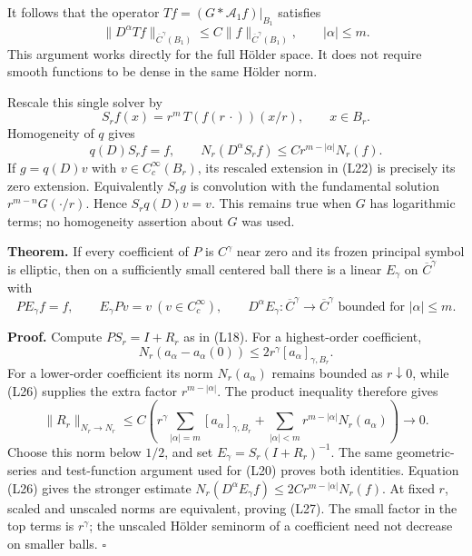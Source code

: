 \documentclass[
  11pt,
]{article}
\makeatletter
\let\ReaderOriginalAnchorStart\hyper@anchorstart
\let\ReaderOriginalAnchorEnd\hyper@anchorend
\let\ReaderPendingAliases\@empty
\def\ReaderArmAliases#1{\gdef\ReaderPendingAliases{#1}}
\def\hyper@anchorstart#1{\ReaderIfNativeAnchorTF{#1}{\ReaderPendingAliases\global\let\ReaderPendingAliases\@empty}{}\ReaderOriginalAnchorStart{#1}}
\makeatother
\begin{document}
It follows that the operator \(T f=(G*\mathcal A_1 f)|_{B_1}\) satisfies
\[
\|D^\alpha Tf\|_{\overline C^\gamma(B_1)}
\leq C\|f\|_{\overline C^\gamma(B_1)},\qquad |\alpha|\leq m.       \tag{L25}
\] This argument works directly for the full Hölder space. It does not
require smooth functions to be dense in the same Hölder norm.

Rescale this single solver by \[
S_rf(x)=r^m\,T(f(r\,\cdot))(x/r),\qquad x\in B_r.
\] Homogeneity of \(q\) gives \[
q(D)S_rf=f,\qquad
N_r(D^\alpha S_rf)\leq C r^{m-|\alpha|}N_r(f).                    \tag{L26}
\] If \(g=q(D)v\) with \(v\in C_c^\infty(B_r)\), its rescaled extension
in (L22) is precisely its zero extension. Equivalently \(S_rg\) is
convolution with the fundamental solution \(r^{m-n}G(\cdot/r)\). Hence
\(S_rq(D)v=v\). This remains true when \(G\) has logarithmic terms; no
homogeneity assertion about \(G\) was used.

\textbf{Theorem.} If every coefficient of \(P\) is \(C^\gamma\) near
zero and its frozen principal symbol is elliptic, then on a sufficiently
small centered ball there is a linear \(E_\gamma\) on
\(\overline C^\gamma\) with \[
PE_\gamma f=f,\qquad E_\gamma Pv=v\ (v\in C_c^\infty),\qquad
D^\alpha E_\gamma:\overline C^\gamma\to\overline C^\gamma
\text{ bounded for }|\alpha|\leq m.                              \tag{L27}
\]

\textbf{Proof.} Compute \(PS_r=I+R_r\) as in (L18). For a highest-order
coefficient, \[
N_r(a_\alpha-a_\alpha(0))\leq2r^\gamma[a_\alpha]_{\gamma,B_r}.
\] For a lower-order coefficient its norm \(N_r(a_\alpha)\) remains
bounded as \(r\downarrow0\), while (L26) supplies the extra factor
\(r^{m-|\alpha|}\). The product inequality therefore gives \[
\|R_r\|_{N_r\to N_r}\leq C\left(
r^\gamma\sum_{|\alpha|=m}[a_\alpha]_{\gamma,B_r}
 +\sum_{|\alpha|<m}r^{m-|\alpha|}N_r(a_\alpha)\right)\longrightarrow0.
                                                                    \tag{L28}
\] Choose this norm below \(1/2\), and set \(E_\gamma=S_r(I+R_r)^{-1}\).
The same geometric-series and test-function argument used for (L20)
proves both identities. Equation (L26) gives the stronger estimate
\(N_r(D^\alpha E_\gamma f)\leq2C r^{m-|\alpha|}N_r(f)\). At fixed \(r\),
scaled and unscaled norms are equivalent, proving (L27). The small
factor in the top terms is \(r^\gamma\); the unscaled Hölder seminorm of
a coefficient need not decrease on smaller balls. \(\square\)

\ReaderArmAliases{\ReaderOriginalAnchorStart{AN03-LCE-006}\ReaderOriginalAnchorEnd\begingroup\expandafter\def\csname @currentHref\endcsname{AN03-LCE-006}\label{AN03-LCE-006}\endgroup\ReaderOriginalAnchorStart{an03-lce-006-an-estimate-uniform-over-open-subsets}\ReaderOriginalAnchorEnd\begingroup\expandafter\def\csname @currentHref\endcsname{an03-lce-006-an-estimate-uniform-over-open-subsets}\label{an03-lce-006-an-estimate-uniform-over-open-subsets}\endgroup\ReaderOriginalAnchorStart{6-an-estimate-uniform-over-open-subsets}\ReaderOriginalAnchorEnd\begingroup\expandafter\def\csname @currentHref\endcsname{6-an-estimate-uniform-over-open-subsets}\label{6-an-estimate-uniform-over-open-subsets}\endgroup\ReaderOriginalAnchorStart{an-estimate-uniform-over-open-subsets}\ReaderOriginalAnchorEnd}
\end{document}
